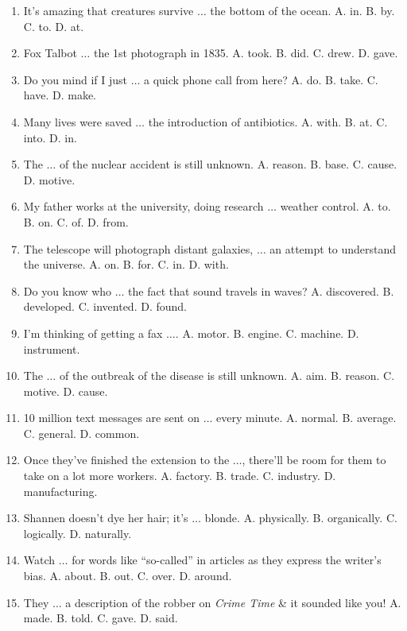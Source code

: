 \documentclass{article}
\numberwithin{equation}{section}
\begin{document}
\begin{enumerate}[leftmargin=8mm]
	\item It's amazing that creatures survive $\ldots$ the bottom of the ocean. {\sf A.} in. {\sf B.} by. {\sf C.} to. {\sf D.} at.
	\item Fox Talbot $\ldots$ the 1st photograph in 1835. {\sf A.} took. {\sf B.} did. {\sf C.} drew. {\sf D.} gave.
	\item Do you mind if I just $\ldots$ a quick phone call from here? {\sf A.} do. {\sf B.} take. {\sf C.} have. {\sf D.} make.
	\item Many lives were saved $\ldots$ the introduction of antibiotics. {\sf A.} with. {\sf B.} at. {\sf C.} into. {\sf D.} in.
	\item The $\ldots$ of the nuclear accident is still unknown. {\sf A.} reason. {\sf B.} base. {\sf C.} cause. {\sf D.} motive.
	\item My father works at the university, doing research $\ldots$ weather control. {\sf A.} to. {\sf B.} on. {\sf C.} of. {\sf D.} from.
	\item The telescope will photograph distant galaxies, $\ldots$ an attempt to understand the universe. {\sf A.} on. {\sf B.} for. {\sf C.} in. {\sf D.} with.
	\item Do you know who $\ldots$ the fact that sound travels in waves? {\sf A.} discovered. {\sf B.} developed. {\sf C.} invented. {\sf D.} found.
	\item I'm thinking of getting a fax $\ldots$. {\sf A.} motor. {\sf B.} engine. {\sf C.} machine. {\sf D.} instrument.
	\item The $\ldots$ of the outbreak of the disease is still unknown. {\sf A.} aim. {\sf B.} reason. {\sf C.} motive. {\sf D.} cause.
	\item 10 million text messages are sent on $\ldots$ every minute. {\sf A.} normal. {\sf B.} average. {\sf C.} general. {\sf D.} common.
	\item Once they've finished the extension to the $\ldots$, there'll be room for them to take on a lot more workers. {\sf A.} factory. {\sf B.} trade. {\sf C.} industry. {\sf D.} manufacturing.
	\item Shannen doesn't dye her hair; it's $\ldots$ blonde. {\sf A.} physically. {\sf B.} organically. {\sf C.} logically. {\sf D.} naturally.
	\item Watch $\ldots$ for words like ``so-called'' in articles as they express the writer's bias. {\sf A.} about. {\sf B.} out. {\sf C.} over. {\sf D.} around.
	\item They $\ldots$ a description of the robber on \textit{Crime Time} \& it sounded like you! {\sf A.} made. {\sf B.} told. {\sf C.} gave. {\sf D.} said.

\end{enumerate}
\end{document}
